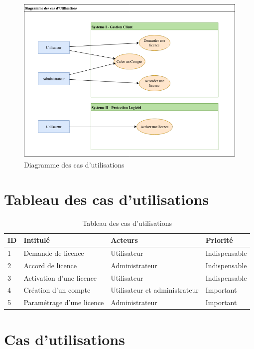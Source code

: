 \begin{figure}[h]
	\centering
	\includegraphics[width=16cm]{main/png/Util.png}
	\caption{Diagramme des cas d'utilisations}
	\label{fig:fig2}
\end{figure}

\section{Tableau des cas d'utilisations}

\begin{table}[h]
	\centering
	\begin{tabular}{ | m{0.6cm} | m{6cm} | m{6cm}| m{3cm} | } 
                \hline
		\textbf{ID} & \textbf{Intitulé} & \textbf{Acteurs} & \textbf{Priorité} \\
                \hline
			1 & Demande de licence & Utilisateur & Indispensable \\
                \hline
			2 & Accord de licence & Administrateur & Indispensable \\
                \hline
			3 & Activation d'une licence & Utilisateur & Indispensable \\
		\hline
			4 & Création d'un compte & Utilisateur et administrateur & Important \\
		\hline
			5 & Paramétrage d'une licence & Administrateur & Important \\
		\hline
        \end{tabular}
	\caption{Tableau des cas d'utilisations}
	\label{tab:tab1}
\end{table}
\newpage

\section{Cas d'utilisations}

